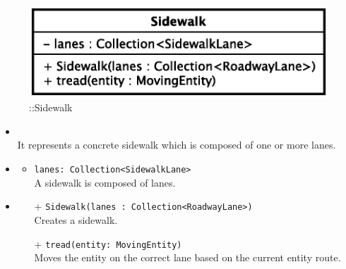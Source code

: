 \begin{figure}[h]
\centering
\includegraphics[scale=0.6,keepaspectratio]{images/solution/app/backend/sidewalk.eps}
\caption{\pReactiveComponent::Sidewalk}
\label{fig:sd-app-sidewalk}
\end{figure}
\FloatBarrier
\begin{itemize}
  \item \textbf{\descr} \\
    It represents a concrete sidewalk which is composed of one or more lanes.
  \item \textbf{\attrs}
  \begin{itemize}
    \item \texttt{lanes: Collection<SidewalkLane>} \\
A sidewalk is composed of lanes.
  \end{itemize}
  \item \textbf{\ops}
  \begin{itemize}
  \item[+] \texttt{Sidewalk(lanes : Collection<RoadwayLane>)} \\
    Creates a sidewalk.
    \item[+] \texttt{tread(entity: MovingEntity)} \\
Moves the entity on the correct lane based on the current entity route. 
  \end{itemize}
\end{itemize}

